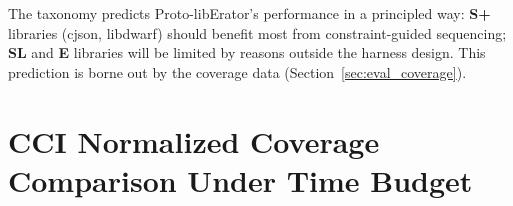 \begin{table}[htb]
\centering
\caption{Library taxonomy across the benchmark. CD = constraint density (inter-edges / API count). Class: \textbf{S+} = highly stateful, high-density; \textbf{S} = stateful; \textbf{SL} = stateless; \textbf{E} = environmentally dependent.}
\label{tab:library_taxonomy}
\small
\setlength{\tabcolsep}{4pt}
\end{table}

The taxonomy predicts Proto-libErator's performance in a principled way: \textbf{S+} libraries (cjson, libdwarf) should benefit most from constraint-guided sequencing; \textbf{SL} and \textbf{E} libraries will be limited by reasons outside the harness design. This prediction is borne out by the coverage data (Section~\ref{sec:eval_coverage}).

\section{CCI Normalized Coverage Comparison Under Time Budget}
\label{sec:eval_cci_comparison}

